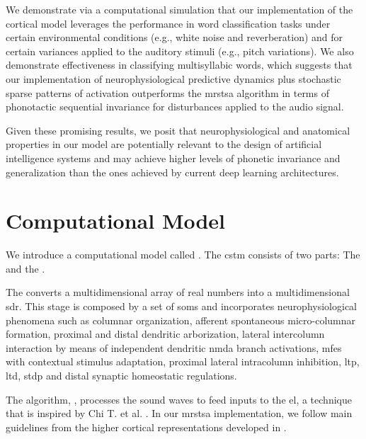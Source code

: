 \documentclass[11pt,a4paper]{article}
\begin{document}
We demonstrate via a computational simulation that our implementation of the cortical model leverages the performance in word classification tasks under certain environmental conditions (e.g., white noise and reverberation) and for certain variances applied to the auditory stimuli (e.g., pitch variations). We also demonstrate effectiveness in classifying multisyllabic words, which suggests that our implementation of neurophysiological predictive dynamics plus stochastic sparse patterns of activation outperforms the \gls{mrstsa} algorithm in terms of phonotactic sequential invariance for disturbances applied to the audio signal. 

Given these promising results, we posit that neurophysiological and anatomical properties in our model are potentially relevant to the design of artificial intelligence systems and may achieve higher levels of phonetic invariance and generalization than the ones achieved by current deep learning architectures.












\section*{Computational Model}

We introduce a computational model called \textbf{}. The \gls{cstm} consists of two parts: The  and the . 

The  converts a multidimensional array of real numbers into a multidimensional \gls{sdr}.
This stage is composed by a set of \glspl{som} \cite{kohonen_2082, Kohonen:1989:SAM:69371}
and incorporates neurophysiological phenomena such as columnar organization, afferent spontaneous
micro-columnar formation, proximal and distal dendritic arborization, lateral intercolumn interaction by means of independent dendritic \gls{nmda} branch activations, \glspl{mfe} with contextual stimulus adaptation, proximal lateral intracolumn inhibition, \gls{ltp}, \gls{ltd}, \gls{stdp} and distal synaptic homeostatic regulations.


The algorithm, , processes the sound waves to feed inputs to the \gls{el}, a technique that is inspired by Chi T. et al. \cite{chi_2005}.
In our \gls{mrstsa} implementation, we follow main guidelines from the higher cortical representations
developed in \cite{chi_2005}.
\end{document}
